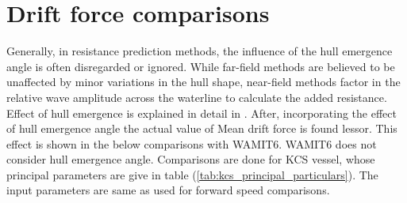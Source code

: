\section{Drift force comparisons}
\label{sec:drift_frc}
Generally, in resistance prediction methods, the influence of the hull emergence 
angle is often disregarded or ignored. While far-field methods are believed to be 
unaffected by minor variations in the hull shape, near-field methods factor 
in the relative wave amplitude across the waterline to calculate the added 
resistance. Effect of hull emergence is explained in detail in \cite{guha2015effect}.
  After, incorporating the effect of hull emergence angle the actual 
value of Mean drift force is found lessor. This effect is shown in the below 
comparisons with WAMIT6. WAMIT6 does not consider hull emergence angle. Comparisons are done for 
KCS vessel, whose principal parameters are give in table (\ref{tab:kcs_principal_particulars}). 
The input parameters are same as used for forward speed comparisons.
